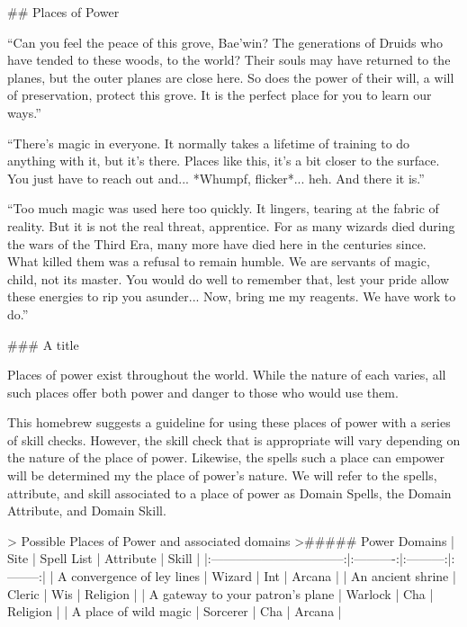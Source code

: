 ## Places of Power

``Can you feel the peace of this grove, Bae'win?  The generations of
Druids who have tended to these woods, to the world?  Their souls may
have returned to the planes, but the outer planes are close here.  So
does the power of their will, a will of preservation, protect this
grove.  It is the perfect place for you to learn our ways.''

``There's magic in everyone.  It normally takes a lifetime of training
to do anything with it, but it's there.  Places like this, it's a bit
closer to the surface.  You just have to reach out and... *Whumpf,
flicker*... heh.  And there it is.''

``Too much magic was used here too quickly.  It lingers, tearing at
the fabric of reality.  But it is not the real threat, apprentice.
For as many wizards died during the wars of the Third Era, many more
have died here in the centuries since.  What killed them was a refusal
to remain humble.  We are servants of magic, child, not its master.
You would do well to remember that, lest your pride allow these
energies to rip you asunder... Now, bring me my reagents.  We have
work to do.''

### A title

Places of power exist throughout the world.  While the
nature of each varies, all such places offer both power and danger to
those who would use them.

This homebrew suggests a guideline for using these places of power
with a series of skill checks.  However, the skill check that is
appropriate will vary depending on the nature of the place of power.
Likewise, the spells such a place can empower will be determined my
the place of power's nature.  We will refer to the spells, attribute,
and skill associated to a place of power as Domain Spells, the Domain
Attribute, and Domain Skill.



> Possible Places of Power and associated domains
>##### Power Domains
| Site                             | Spell List | Attribute | Skill    |
|:--------------------------------:|:----------:|:---------:|:--------:|
| A convergence of ley lines       |  Wizard    |  Int      | Arcana   |
| An ancient shrine                |  Cleric    |  Wis      | Religion |
| A gateway to your patron's plane |  Warlock   |  Cha      | Religion |
| A place of wild magic            |  Sorcerer  |  Cha      | Arcana   |

